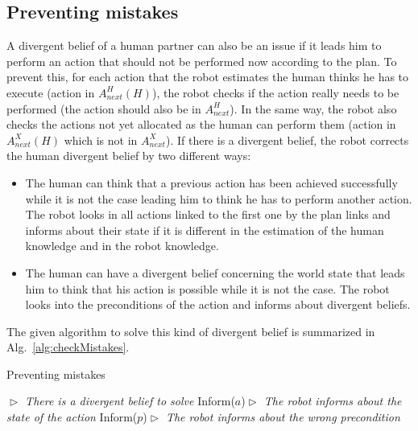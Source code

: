 \documentclass[english,a4paper,11pt,twoside]{StyleThese}
\begin{document}
\subsection{Preventing mistakes}

A divergent belief of a human partner can also be an issue if it leads him to perform an action that should not be performed now according to the plan. To prevent this, for each action that the robot estimates the human thinks he has to execute (action in $A^H_{next}(H)$), the robot checks if the action really needs to be performed (the action should also be in $A^H_{next}$). In the same way, the robot also checks the actions not yet allocated as the human can perform them (action in $A^X_{next}(H)$ which is not in $A^X_{next}$). If there is a divergent belief, the robot corrects the human divergent belief by two different ways:
\begin{itemize}
\item The human can think that a previous action has been achieved successfully while it is not the case leading him to think he has to perform another action. The robot looks in all actions linked to the first one by the plan links and informs about their state if it is different in the estimation of the human knowledge and in the robot knowledge.
\item The human can have a divergent belief concerning the world state that leads him to think that his action is possible while it is not the case. The robot looks into the preconditions of the action and informs about divergent beliefs.
\end{itemize}
The given algorithm to solve this kind of divergent belief is summarized in Alg.~\ref{alg:checkMistakes}.


\begin{algorithm}
\caption{Preventing mistakes}
\label{alg:checkMistakes}
\begin{algorithmic}
\STATE \hfill \textit{$\vartriangleright$ There is a divergent belief to solve}
\STATE Inform($a$)\hfill \textit{$\vartriangleright$ The robot informs about the state of the action}
\ENDIF
{}
\STATE Inform($p$)\hfill \textit{$\vartriangleright$ The robot informs about the wrong precondition}
\ENDIF
\ENDIF
\end{algorithmic}
\end{algorithm} 
\end{document}
